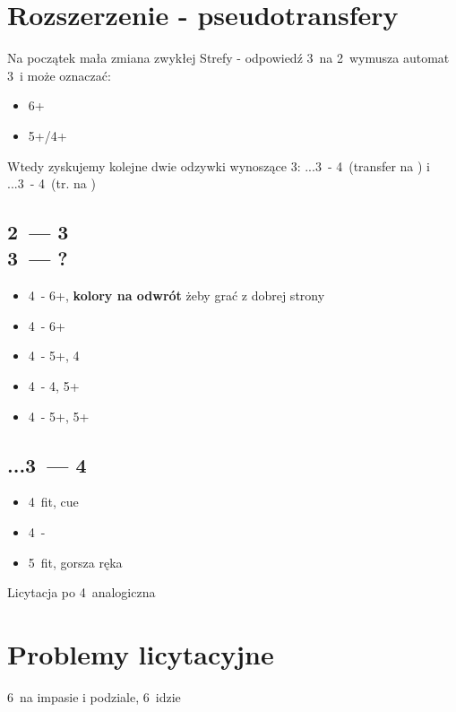 \documentclass[12pt, a4paper]{article}
\begin{document}
    \section{Rozszerzenie - pseudotransfery}
    Na początek mała zmiana zwykłej Strefy - odpowiedź 3\spades\ na 2\nt\ wymusza automat 3\nt\ i może oznaczać:
    \begin{itemize}
        \item 6+\minor
        \item 5+/4+ \minor
    \end{itemize}
    Wtedy zyskujemy kolejne dwie odzywki wynoszące 3\nt:
    ...3\nt\ - 4\diams\ (transfer na \clubs) i ...3\nt\ - 4\hearts\ (tr. na \diams)
    \subsection{2\ntx\ --- 3\spades \\ 3\ntx\ --- ?}
    \begin{itemize}
        \item 4\clubs\ - 6+\diams, \textbf{kolory na odwrót} żeby grać z dobrej strony
        \item 4\diams\ - 6+\clubs 
        \item 4\hearts\ - 5+\clubs, 4\diams
        \item 4\spades\ - 4\clubs, 5+\diams 
        \item 4\nt\ - 5+\clubs, 5+\diams
    \end{itemize}
    \subsection{...3\ntx\ --- 4\diams}
    \begin{itemize}
        \item 4\major\ fit, cue
        \item 4\nt\ - \soff
        \item 5\clubs\ fit, gorsza ręka
    \end{itemize}
    Licytacja po 4\hearts\ analogiczna

    \section{Problemy licytacyjne}

    \begin{hand}[h]
        \centering
        \caption{6\nt\ na impasie i podziale, 6\clubs\ idzie}
    \end{hand}
\end{document}
